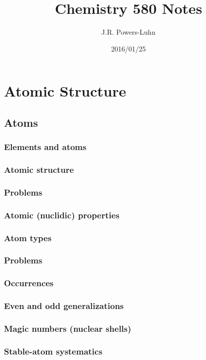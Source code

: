 \documentclass{article}
\author{J.R. Powers-Luhn}
\date{2016/01/25}
\title{Chemistry 580 Notes}
\begin{document}
\section{Atomic Structure}

\subsection{Atoms}

\subsubsection{Elements and atoms}

\subsubsection{Atomic structure}

\subsubsection{Problems}

\subsubsection{Atomic (nuclidic) properties}

\subsubsection{Atom types}

\subsubsection{Problems}

\subsubsection{Occurrences}

\subsubsection{Even and odd generalizations}

\subsubsection{Magic numbers (nuclear shells)}

\subsubsection{Stable-atom systematics}
\end{document}
